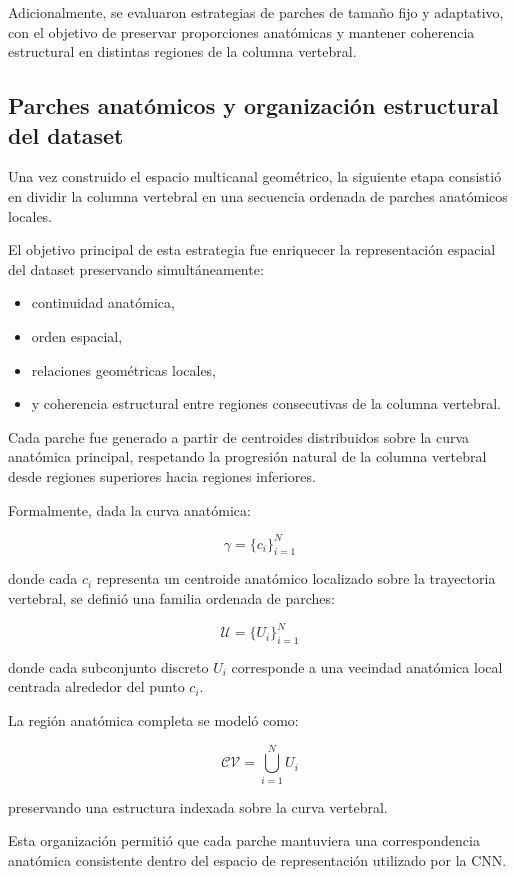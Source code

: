 \documentclass[conference]{IEEEtran}
\begin{document}
Adicionalmente, se evaluaron estrategias de parches de tamaño fijo y adaptativo, con el objetivo de preservar proporciones anatómicas y mantener coherencia estructural en distintas regiones de la columna vertebral.


\subsection{Parches anatómicos y organización estructural del dataset}

Una vez construido el espacio multicanal geométrico, la siguiente etapa consistió en dividir la columna vertebral en una secuencia ordenada de parches anatómicos locales.

El objetivo principal de esta estrategia fue enriquecer la representación espacial del dataset preservando simultáneamente:

\begin{itemize}
    \item continuidad anatómica,
    \item orden espacial,
    \item relaciones geométricas locales,
    \item y coherencia estructural entre regiones consecutivas de la columna vertebral.
\end{itemize}

Cada parche fue generado a partir de centroides distribuidos sobre la curva anatómica principal, respetando la progresión natural de la columna vertebral desde regiones superiores hacia regiones inferiores.

Formalmente, dada la curva anatómica:

\[
\gamma = \{c_i\}_{i=1}^{N}
\]

donde cada $c_i$ representa un centroide anatómico localizado sobre la trayectoria vertebral, se definió una familia ordenada de parches:

\[
\mathcal{U}=\{U_i\}_{i=1}^{N}
\]

donde cada subconjunto discreto $U_i$ corresponde a una vecindad anatómica local centrada alrededor del punto $c_i$.

La región anatómica completa se modeló como:

\[
\mathcal{CV}
=
\bigcup_{i=1}^{N} U_i
\]

preservando una estructura indexada sobre la curva vertebral.

Esta organización permitió que cada parche mantuviera una correspondencia anatómica consistente dentro del espacio de representación utilizado por la CNN.
\end{document}
